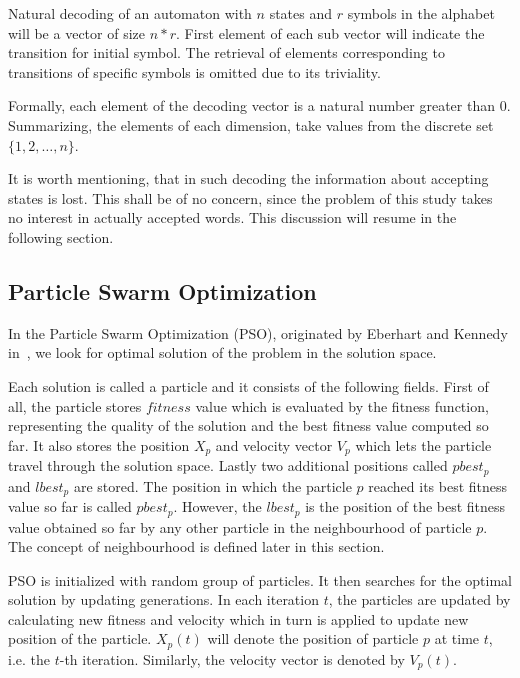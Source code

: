 \documentclass[runningheads, a4paper]{llncs}
\begin{document}
Natural decoding of an automaton with $n$ states and $r$ symbols in the alphabet will be a vector of size $n*r$. First element of each sub vector will indicate the transition for initial symbol. The retrieval of elements corresponding to transitions of specific symbols is omitted due to its triviality.

Formally, each element of the decoding vector is a natural number greater than 0. Summarizing, the elements of each dimension, take values from the discrete set $\{1,2, \ldots, n\}$.

It is worth mentioning, that in such decoding the information about accepting states is lost. This shall be of no concern, since the problem of this study takes no interest in actually accepted words. This discussion will resume in the following section.

\subsection{Particle Swarm Optimization}
In the Particle Swarm Optimization (PSO), originated by Eberhart and Kennedy in~\cite{pso_origin}, we look for optimal solution of the problem in the solution space. 

Each solution is called a particle and it consists of the following fields. First of all, the particle stores $fitness$ value which is evaluated by the fitness function, representing the quality of the solution and the best fitness value computed so far. It also stores the position $X_p$ and velocity vector $V_p$ which lets the particle travel through the solution space. Lastly two additional positions called $pbest_p$ and $lbest_p$ are stored. The position in which the particle $p$ reached its best fitness value so far is called $pbest_p$. However, the $lbest_p$ is the position of the best fitness value obtained so far by any other particle in the neighbourhood of particle $p$. The concept of neighbourhood is defined later in this section.

PSO is initialized with random group of particles. It then searches for the optimal solution by updating generations.
In each iteration $t$, the particles are updated by calculating new fitness and velocity which in turn is applied to update new position of the particle. $X_p(t)$ will denote the position of particle $p$ at time $t$, i.e. the $t$-th iteration. Similarly, the velocity vector is denoted by $V_p(t)$.
\end{document}
